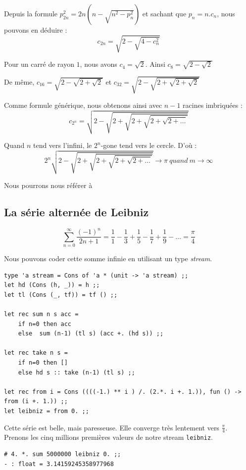 \documentclass[11pt]{book}
\begin{document}
\vspace{1cm}
Depuis la formule $  p_{2n}^2 = 2n (n - \sqrt{n^2-p_n^2})  $ et sachant que $p_n = n.c_n$, 
nous pouvons en déduire :
$$ c_{2n} = \sqrt{2-\sqrt{4-c_n^2}} $$

Pour un carré de rayon $1$, nous avons $c_4=\sqrt{2}$. Ainsi $c_8= \sqrt{2-\sqrt{2}}$

De même, $c_{16}=\sqrt{2-\sqrt{2+\sqrt{2}}} $  et $c_{32}=\sqrt{2-\sqrt{2+\sqrt{2+\sqrt2}}} $

Comme formule générique, nous obtenons ainsi avec $n-1$ racines imbriquées :
$$c_{2^n}=\sqrt{2-\sqrt{2+\sqrt{2+\sqrt{2+\sqrt{2+\dots}}}}}$$ 

Quand $n$ tend vers l'infini, le $2^n$-gone tend vers le cercle. D'où :
$$ 2^n \sqrt{2-\sqrt{2+\sqrt{2+\sqrt{2+\sqrt{2+\dots}}}}} \rightarrow \pi\ quand\ m \rightarrow \infty $$

Nous pourrons nous référer à \cite{wm}


\subsection{La série alternée de Leibniz}
\[ \sum_{n=0}^\infty \frac{(-1)^n}{2n+1} = \frac{1}{1} -\frac{1}{3}+\frac{1}{5}-\frac{1}{7}+\frac{1}{9} - \dots = \frac{\pi}{4}  \]

Nous pouvons coder cette somme infinie en utilisant un type \textit{stream}. 

\begin{Verbatim}
type 'a stream = Cons of 'a * (unit -> 'a stream) ;;
let hd (Cons (h, _)) = h ;;
let tl (Cons (_, tf)) = tf () ;;

let rec sum n s acc =
	if n=0 then acc
	else  sum (n-1) (tl s) (acc +. (hd s)) ;;

let rec take n s =
	if n=0 then []
	else hd s :: take (n-1) (tl s) ;;

let rec from i = Cons ((((-1.) ** i ) /. (2.*. i +. 1.)), fun () -> from (i +. 1.)) ;;
let leibniz = from 0. ;;
\end{Verbatim}


Cette série est belle, mais paresseuse. Elle converge très lentement vers $\frac{\pi}{4}$. 
Prenons les cinq millions premières valeurs de notre stream \verb+leibniz+.
\begin{Verbatim}
# 4. *. sum 5000000 leibniz 0. ;;
- : float = 3.14159245358977968
\end{Verbatim}
\end{document}
